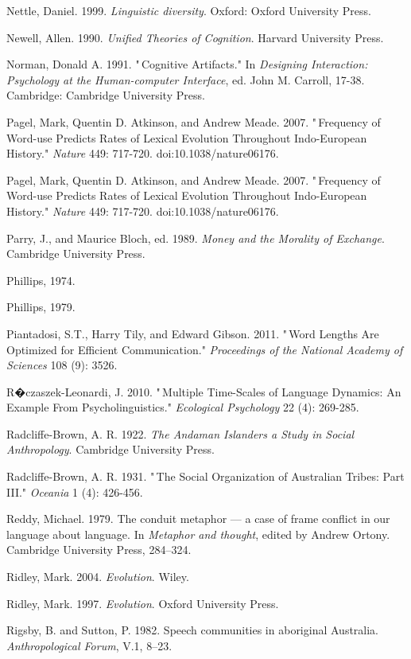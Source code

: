 Nettle, Daniel. 1999. \textit{Linguistic diversity}. Oxford: Oxford 
University Press.

Newell, Allen. 1990. \textit{Unified Theories of Cognition}. Harvard 
University Press.

Norman, Donald A. 1991. "\,Cognitive Artifacts." In \textit{Designing 
Interaction: Psychology at the Human-computer Interface}, ed. John M. 
Carroll, 17-38. Cambridge: Cambridge University Press.

Pagel, Mark, Quentin D. Atkinson, and Andrew Meade. 2007. "\,Frequency 
of Word-use Predicts Rates of Lexical Evolution Throughout Indo-European 
History." \textit{Nature} 449: 717-720. doi:10.1038/nature06176.

Pagel, Mark, Quentin D. Atkinson, and Andrew Meade. 2007. "\,Frequency 
of Word-use Predicts Rates of Lexical Evolution Throughout Indo-European 
History." \textit{Nature} 449: 717-720. doi:10.1038/nature06176.

Parry, J., and Maurice Bloch, ed. 1989. \textit{Money and the Morality 
of Exchange}. Cambridge University Press.

Phillips, 1974.

Phillips, 1979.

Piantadosi, S.T., Harry Tily, and Edward Gibson. 2011. "\,Word Lengths 
Are Optimized for Efficient Communication." \textit{Proceedings of the 
National Academy of Sciences} 108 (9): 3526.

R�czaszek-Leonardi, J. 2010. "\,Multiple Time-Scales of Language 
Dynamics: An Example From Psycholinguistics." \textit{Ecological 
Psychology} 22 (4): 269-285.

Radcliffe-Brown, A. R. 1922. \textit{The Andaman Islanders a Study in 
Social Anthropology}. Cambridge University Press.

Radcliffe-Brown, A. R. 1931. "\,The Social Organization of Australian 
Tribes: Part III." \textit{Oceania} 1 (4): 426-456.

Reddy, Michael. 1979. The conduit metaphor --- a case of frame conflict 
in our language about language. In \textit{Metaphor and thought}, 
edited by\textit{ }Andrew Ortony. Cambridge University Press, 
284--324.

Ridley, Mark. 2004. \textit{Evolution}. Wiley.

Ridley, Mark. 1997. \textit{Evolution}. Oxford University Press.

Rigsby, B. and Sutton, P. 1982. Speech communities in aboriginal 
Australia. \textit{Anthropological Forum}, V.1, 8--23.

